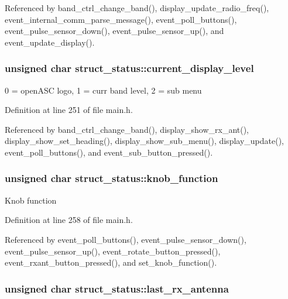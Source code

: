 Referenced by band\_\-ctrl\_\-change\_\-band(), display\_\-update\_\-radio\_\-freq(), event\_\-internal\_\-comm\_\-parse\_\-message(), event\_\-poll\_\-buttons(), event\_\-pulse\_\-sensor\_\-down(), event\_\-pulse\_\-sensor\_\-up(), and event\_\-update\_\-display().\hypertarget{structstruct__status_751519c9ba01b235d43e19b758c3a127}{
\subsubsection[{current\_\-display\_\-level}]{\setlength{\rightskip}{0pt plus 5cm}unsigned char {\bf struct\_\-status::current\_\-display\_\-level}}}
\label{structstruct__status_751519c9ba01b235d43e19b758c3a127}


0 = openASC logo, 1 = curr band level, 2 = sub menu 

Definition at line 251 of file main.h.

Referenced by band\_\-ctrl\_\-change\_\-band(), display\_\-show\_\-rx\_\-ant(), display\_\-show\_\-set\_\-heading(), display\_\-show\_\-sub\_\-menu(), display\_\-update(), event\_\-poll\_\-buttons(), and event\_\-sub\_\-button\_\-pressed().\hypertarget{structstruct__status_95ed8ab2c7b3d131d9478e3a2b8d772c}{
\subsubsection[{knob\_\-function}]{\setlength{\rightskip}{0pt plus 5cm}unsigned char {\bf struct\_\-status::knob\_\-function}}}
\label{structstruct__status_95ed8ab2c7b3d131d9478e3a2b8d772c}


Knob function 

Definition at line 258 of file main.h.

Referenced by event\_\-poll\_\-buttons(), event\_\-pulse\_\-sensor\_\-down(), event\_\-pulse\_\-sensor\_\-up(), event\_\-rotate\_\-button\_\-pressed(), event\_\-rxant\_\-button\_\-pressed(), and set\_\-knob\_\-function().\hypertarget{structstruct__status_a676f93ffd0700bb574a0ca35961cd2d}{
\subsubsection[{last\_\-rx\_\-antenna}]{\setlength{\rightskip}{0pt plus 5cm}unsigned char {\bf struct\_\-status::last\_\-rx\_\-antenna}}}
\label{structstruct__status_a676f93ffd0700bb574a0ca35961cd2d}


